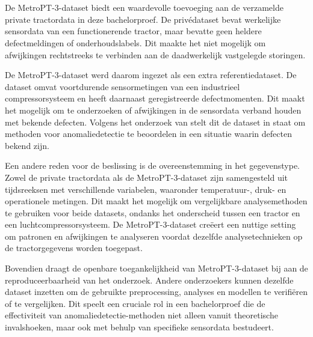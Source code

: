 
\section{}%
\label{sec: De redenen voor het toepassen van MetroPT-3-dataset}

De MetroPT-3-dataset biedt een waardevolle toevoeging aan de verzamelde private tractordata in deze bachelorproef. De privédataset bevat werkelijke sensordata van een functionerende tractor, maar bevatte geen heldere defectmeldingen of onderhoudslabels. Dit maakte het niet mogelijk om afwijkingen rechtstreeks te verbinden aan de daadwerkelijk vastgelegde storingen.

De MetroPT-3-dataset werd daarom ingezet als een extra referentiedataset. De dataset omvat voortdurende sensormetingen van een industrieel compressorsysteem en heeft daarnaast geregistreerde defectmomenten. Dit maakt het mogelijk om te onderzoeken of afwijkingen in de sensordata verband houden met bekende defecten. Volgens het onderzoek van \textcite{Veloso2022} stelt dit de dataset in staat om methoden voor anomaliedetectie te beoordelen in een situatie waarin defecten bekend zijn.

Een andere reden voor de beslissing is de overeenstemming in het gegevenstype. Zowel de private tractordata als de MetroPT-3-dataset zijn samengesteld uit tijdsreeksen met verschillende variabelen, waaronder temperatuur-, druk- en operationele metingen. Dit maakt het mogelijk om vergelijkbare analysemethoden te gebruiken voor beide datasets, ondanks het onderscheid tussen een tractor en een luchtcompressorsysteem. De MetroPT-3-dataset creëert een nuttige setting om patronen en afwijkingen te analyseren voordat dezelfde analysetechnieken op de tractorgegevens worden toegepast.

Bovendien draagt de openbare toegankelijkheid van MetroPT-3-dataset bij aan de reproduceerbaarheid van het onderzoek. Andere onderzoekers kunnen dezelfde dataset inzetten om de gebruikte preprocessing, analyses en modellen te verifiëren of te vergelijken. Dit speelt een cruciale rol in een bachelorproef die de effectiviteit van anomaliedetectie-methoden niet alleen vanuit theoretische invalshoeken, maar ook met behulp van specifieke sensordata bestudeert.

